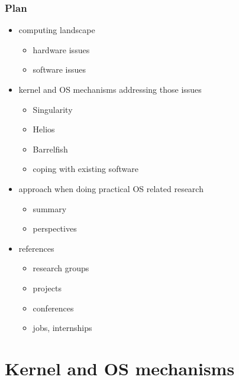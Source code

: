 \begin{frame}
 \frametitle{Plan}

 \begin{itemize}
   \item
     computing landscape
     \begin{itemize}
       \item hardware issues
       \item software issues
     \end{itemize}
   \item
     kernel and OS mechanisms addressing those issues
     \begin{itemize}
       \item Singularity
       \item Helios
       \item Barrelfish
       \item coping with existing software
     \end{itemize}
   \item
     approach when doing practical OS related research
     \begin{itemize}
       \item summary
       \item perspectives
     \end{itemize}
   \item
     references
     \begin{itemize}
       \item research groups
       \item projects
       \item conferences
       \item jobs, internships
     \end{itemize}
 \end{itemize}
\end{frame}


%
%

%
%

\section{Kernel and OS mechanisms}


